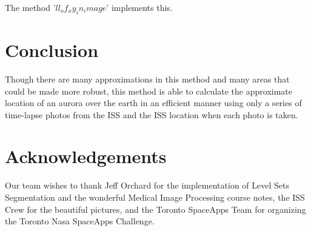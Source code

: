 \documentclass[12pt]{article}
\theoremstyle{definition}
\begin{document}
The method '$ll_of_xy_in_image$' implements this.

\section{ \bf Conclusion }

Though there are many approximations in this method and many areas that could be made more robust, this method is able to calculate the approximate location of an aurora over the earth in an efficient manner using only a series of time-lapse photos from the ISS and the ISS location when each photo is taken.

\section{ \bf Acknowledgements }

Our team wishes to thank Jeff Orchard for the implementation of Level Sets Segmentation and the wonderful Medical Image Processing course notes, the ISS Crew for the beautiful pictures, and the Toronto SpaceApps Team for organizing the Toronto Nasa SpaceApps Challenge.

%




\end{document}
